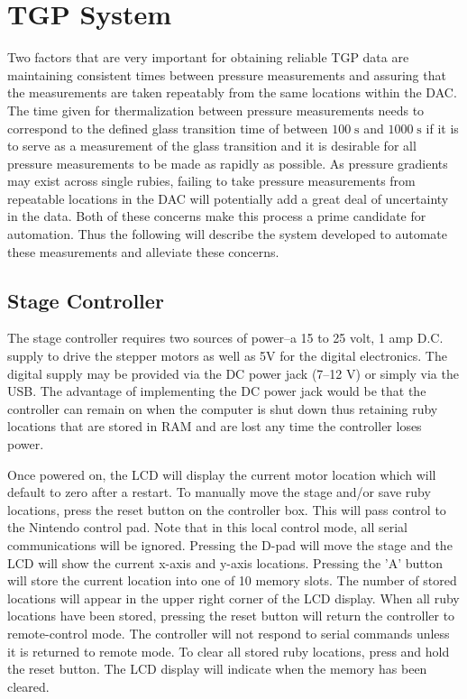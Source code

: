 \section{TGP System}\label{sec:TGP}

Two factors that are very important for obtaining reliable TGP data are maintaining consistent times between pressure measurements and assuring that the measurements are taken repeatably from the same locations within the DAC.  The time given for thermalization between pressure measurements needs to correspond to the defined glass transition time of between $100\;\si{\second}$ and $1000\;\si{\second}$ if it is to serve as a measurement of the glass transition and it is desirable for all pressure measurements to be made as rapidly as possible.  As pressure gradients may exist across single rubies, failing to take pressure measurements from repeatable locations in the DAC will potentially add a great deal of uncertainty in the data.  Both of these concerns make this process a prime candidate for automation.  Thus the following will describe the system developed to automate these measurements and alleviate these concerns.

\subsection{Stage Controller}
The stage controller requires two sources of power--a 15 to 25 volt, 1 amp D.C. supply to drive the stepper motors as well as 5V for the digital electronics.  The digital supply may be provided via the DC power jack (7\---12 \si{\volt}) or simply via the USB.  The advantage of implementing the DC power jack would be that the controller can remain on when the computer is shut down thus retaining ruby locations that are stored in RAM and are lost any time the controller loses power.

Once powered on, the LCD will display the current motor location which will default to zero after a restart.  To manually move the stage and/or save ruby locations, press the reset button on the controller box.  This will pass control to the Nintendo control pad.  Note that in this local control mode, all serial communications will be ignored.  Pressing the D\--pad will move the stage and the LCD will show the current x\--axis and y\--axis locations.  Pressing the 'A' button will store the current location into one of 10 memory slots.  The number of stored locations will appear in the upper right corner of the LCD display.  When all ruby locations have been stored, pressing the reset button will return the controller to remote-control mode.  The controller will not respond to serial commands unless it is returned to remote mode.  To clear all stored ruby locations, press and hold the reset button.  The LCD display will indicate when the memory has been cleared.  

